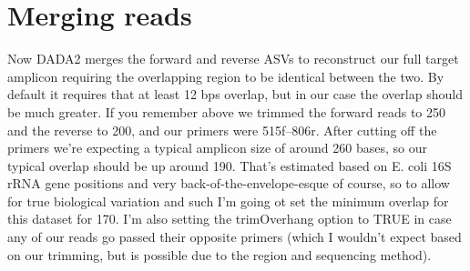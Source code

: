 \documentclass[
]{book}
\newenvironment{Shaded}{\begin{snugshade}}{\end{snugshade}}
\newcommand{\AttributeTok}[1]{\textcolor[rgb]{0.13,0.29,0.53}{#1}}
\newcommand{\CommentTok}[1]{\textcolor[rgb]{0.56,0.35,0.01}{\textit{#1}}}
\newcommand{\ConstantTok}[1]{\textcolor[rgb]{0.56,0.35,0.01}{#1}}
\newcommand{\DecValTok}[1]{\textcolor[rgb]{0.00,0.00,0.81}{#1}}
\newcommand{\FunctionTok}[1]{\textcolor[rgb]{0.13,0.29,0.53}{\textbf{#1}}}
\newcommand{\NormalTok}[1]{#1}
\newcommand{\OtherTok}[1]{\textcolor[rgb]{0.56,0.35,0.01}{#1}}
\newcommand{\SpecialCharTok}[1]{\textcolor[rgb]{0.81,0.36,0.00}{\textbf{#1}}}
\begin{document}
\hypertarget{merging-reads}{%
\section{Merging reads}\label{merging-reads}}

Now DADA2 merges the forward and reverse ASVs to reconstruct our full target amplicon requiring the overlapping region to be identical between the two. By default it requires that at least 12 bps overlap, but in our case the overlap should be much greater. If you remember above we trimmed the forward reads to 250 and the reverse to 200, and our primers were 515f--806r. After cutting off the primers we're expecting a typical amplicon size of around 260 bases, so our typical overlap should be up around 190. That's estimated based on E. coli 16S rRNA gene positions and very back-of-the-envelope-esque of course, so to allow for true biological variation and such I'm going ot set the minimum overlap for this dataset for 170. I'm also setting the trimOverhang option to TRUE in case any of our reads go passed their opposite primers (which I wouldn't expect based on our trimming, but is possible due to the region and sequencing method).

\begin{Shaded}
\end{Shaded}
\end{document}
